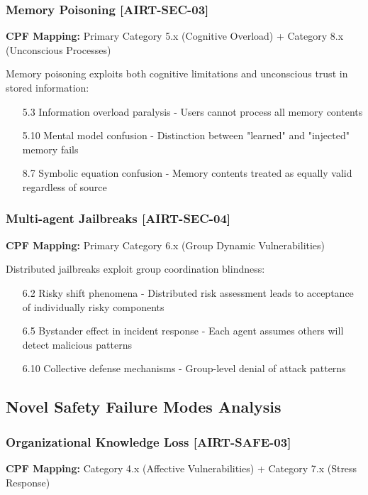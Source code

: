 \documentclass[11pt,a4paper]{article}
\begin{document}
\subsubsection{Memory Poisoning [AIRT-SEC-03]}

\textbf{CPF Mapping:} Primary Category 5.x (Cognitive Overload) + Category 8.x (Unconscious Processes)

Memory poisoning exploits both cognitive limitations and unconscious trust in stored information:
\begin{itemize}
\item [5.3] Information overload paralysis - Users cannot process all memory contents
\item [5.10] Mental model confusion - Distinction between "learned" and "injected" memory fails
\item [8.7] Symbolic equation confusion - Memory contents treated as equally valid regardless of source
\end{itemize}

\subsubsection{Multi-agent Jailbreaks [AIRT-SEC-04]}

\textbf{CPF Mapping:} Primary Category 6.x (Group Dynamic Vulnerabilities)

Distributed jailbreaks exploit group coordination blindness:
\begin{itemize}
\item [6.2] Risky shift phenomena - Distributed risk assessment leads to acceptance of individually risky components
\item [6.5] Bystander effect in incident response - Each agent assumes others will detect malicious patterns
\item [6.10] Collective defense mechanisms - Group-level denial of attack patterns
\end{itemize}

\subsection{Novel Safety Failure Modes Analysis}

\subsubsection{Organizational Knowledge Loss [AIRT-SAFE-03]}

\textbf{CPF Mapping:} Category 4.x (Affective Vulnerabilities) + Category 7.x (Stress Response)
\end{document}
